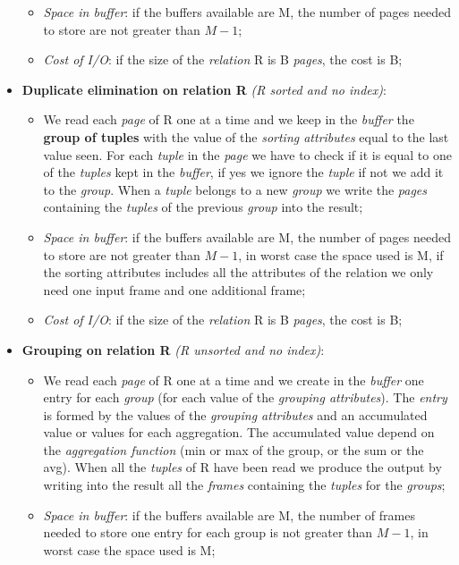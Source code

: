 \documentclass{article}
\begin{document}
\begin{itemize}
\begin{itemize}
\item \emph{Space in buffer}: if the buffers available are M, the number of pages needed to store are not greater than $M-1$;
\item \emph{Cost of I/O}: if the size of the \emph{relation} R is B \emph{pages}, the cost is B;
\end{itemize}
\item \textbf{Duplicate elimination on relation R}\emph{ (R sorted and no index)}:
\begin{itemize}
\item We read each \emph{page} of R one at a time and we keep in the \emph{buffer} the \textbf{group of tuples} with the value of the \emph{sorting attributes} equal to the last value seen. For each \emph{tuple} in the \emph{page} we have to check if it is equal to one of the \emph{tuples} kept in the \emph{buffer}, if yes we ignore the \emph{tuple} if not we add it to the \emph{group}. When a \emph{tuple} belongs to a new \emph{group} we write the \emph{pages} containing the \emph{tuples} of the previous \emph{group} into the result;
\item \emph{Space in buffer}: if the buffers available are M, the number of pages needed to store are not greater than $M-1$, in worst case the space used is M, if the sorting attributes includes all the attributes of the relation we only need one input frame and one additional frame;
\item \emph{Cost of I/O}: if the size of the \emph{relation} R is B \emph{pages}, the cost is B; 
\end{itemize}
\item \textbf{Grouping on relation R}\emph{ (R unsorted and no index)}:
\begin{itemize}
\item We read each \emph{page} of R one at a time and we create in the \emph{buffer} one entry for each \emph{group} (for each value of the \emph{grouping attributes}). The \emph{entry} is formed by the values of the \emph{grouping attributes} and an accumulated value or values for each aggregation. The accumulated value depend on the \emph{aggregation function} (min or max of the group, or the sum or the avg). When all the \emph{tuples} of R have been read we produce the output by writing into the result all the \emph{frames} containing the \emph{tuples} for the \emph{groups};
\item \emph{Space in buffer}: if the buffers available are M, the number of frames needed to store one entry for each group is not greater than $M-1$, in worst case the space used is M;

\end{itemize}
\end{itemize}
\end{document}
